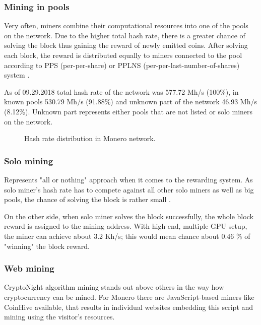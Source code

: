 \documentclass[
  printed, %
  table,   %
  lof,     %
  lot,     %
           oneside, color
]{fithesis3}
\begin{document}
\subsubsection{Mining in pools}
\label{cha:poolmining}
Very often, miners combine their computational resources into one of the pools on the network. Due to the higher total hash rate, there is a greater chance of solving the block thus gaining the reward of newly emitted coins. After solving each block, the reward is distributed equally to miners connected to the pool according to PPS (per-per-share) or PPLNS (per-per-last-number-of-shares) system \cite{tarasiewicz2015cryptocurrencies}.

As of 09.29.2018 total hash rate of the network was 577.72 Mh/s (100\%), in known pools 530.79 Mh/s (91.88\%) and unknown part of the network 46.93 Mh/s (8.12\%). Unknown part represents either pools that are not listed or solo miners on the network.


\begin{figure}[H]
\begin{center}
     \end{center}
      \caption{Hash rate distribution in Monero network.}
      \label{chart:range}

\end{figure}
\subsubsection{Solo mining}
Represents "all or nothing" approach when it comes to the rewarding system. As solo miner's hash rate has to compete against all other solo miners as well as big pools, the chance of solving the block is rather small \cite{cong2018decentralized}.

On the other side, when solo miner solves the block successfully, the whole block reward is assigned to the mining address. With high-end, multiple GPU setup, the miner can achieve about 3.2 Kh/s; this would mean chance about 0.46 \% of "winning" the block reward. 

\subsubsection{Web mining}
\label{cpumining}
CryptoNight algorithm mining stands out above others in the way how cryptocurrency can be mined. For Monero there are JavaScript-based miners like CoinHive available, that results in individual websites embedding this script and mining using the visitor's resources. 
\end{document}
